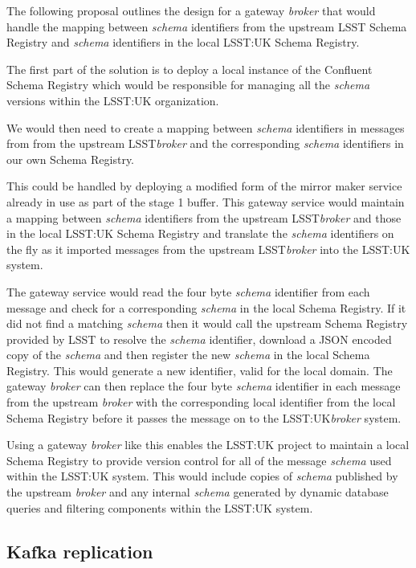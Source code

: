 \documentclass{article}
\newcommand{\json} {JSON\xspace}
\newcommand{\kfbroker} {\textit{broker}\xspace}
\newcommand{\confluent} {Confluent\xspace}
\newcommand{\avschema} {\textit{schema}\xspace}
\newcommand{\conschemaregistry} {Schema Registry\xspace}
\newcommand{\stageone} {stage 1\xspace}
\newcommand{\lsst} {LSST\xspace}
\newcommand{\lsstuk} {LSST:UK\xspace}
\begin{document}
The following proposal outlines the design for a gateway \kfbroker that would handle the mapping between \avschema identifiers from the upstream \lsst \conschemaregistry and \avschema identifiers in the local \lsstuk \conschemaregistry.

The first part of the solution is to deploy a local instance of the \confluent \conschemaregistry which would be responsible for managing all the \avschema versions within the \lsstuk organization.

We would then need to create a mapping between \avschema identifiers in messages from from the upstream \lsst \kfbroker and the corresponding \avschema identifiers in our own \conschemaregistry.

This could be handled by deploying a modified form of the mirror maker service already in use as part of the \stageone buffer.
This gateway service would maintain a mapping between \avschema identifiers from the upstream \lsst \kfbroker and those in the local \lsstuk \conschemaregistry and translate the \avschema identifiers on the fly as it imported messages from the upstream \lsst \kfbroker into the \lsstuk system.

The gateway service would read the four byte \avschema identifier from each message and check for a corresponding \avschema in the local \conschemaregistry. If it did not find a matching \avschema then it would call the upstream \conschemaregistry provided by \lsst to resolve the \avschema identifier, download a \json encoded copy of the \avschema and then register the new \avschema in the local \conschemaregistry. This would generate a new identifier, valid for the local domain.
The gateway \kfbroker can then replace the four byte \avschema identifier in each message from the upstream \kfbroker with the corresponding local identifier from the local \conschemaregistry before it passes the message on to the \lsstuk \kfbroker system.

Using a gateway \kfbroker like this enables the \lsstuk project to maintain a local \conschemaregistry to provide version control for all of the message \avschema used within the \lsstuk system. This would include copies of \avschema published by the upstream \kfbroker and any internal \avschema generated by dynamic database queries and filtering components within the \lsstuk system.

\subsection{Kafka replication}
\label{kafka-data-storage}
\end{document}
